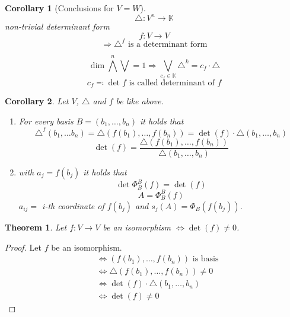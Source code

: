 \documentclass[a4paper,landscape,twocolumn]{article}
\newtheorem{theorem}{Theorem}
\newtheorem{cor}{Corollary}
\begin{document}
\begin{cor}[Conclusions for $V = W$]
  \label{cor-7.26}
  \[ \triangle: V^n \to \mathbb K \]
  non-trivial determinant form
  \[ f: V \to V \]
  \[ \Rightarrow \triangle^f \text{ is a determinant form} \]

  \[ \dim{\bigwedge^n \bigvee} = 1 \Rightarrow \bigvee_{c_f \in \mathbb K} \triangle^k = c_f \cdot \triangle \]
  \[ c_f \eqqcolon \det{f} \text{ is called determinant of $f$} \]
\end{cor}

\begin{cor}
  \label{cor-7.27}
  Let $V$, $\triangle$ and $f$ be like above.
  \begin{enumerate}
    \item
      For every basis $B = (b_1, \ldots, b_n)$
      it holds that
      \[ \triangle^f(b_1, \ldots b_n) = \triangle(f(b_1), \ldots, f(b_n)) = \det(f) \cdot \triangle(b_1, \ldots, b_n) \]
      \[ \det(f) = \frac{\triangle(f(b_1), \ldots, f(b_n))}{\triangle(b_1, \ldots, b_n)} \]
    \item
      with $a_j = f(b_j)$ it holds that
      \[ \det{\Phi_B^B(f)} = \det(f) \]
      \[ A = \Phi_B^B(f) \]
      $a_{ij} = $ i-th coordinate of $f(b_j)$ and $s_j(A) = \Phi_B(f(b_j))$.
  \end{enumerate}
\end{cor}

\begin{theorem}
  \label{theorem-7.28}
  Let $f: V \to V$ be an isomorphism $\Leftrightarrow \det(f) \neq 0$.
\end{theorem}
\begin{proof}
  Let $f$ be an isomorphism.
  \begin{align*}
    &\Leftrightarrow (f(b_1), \ldots, f(b_n)) \text{ is basis} \\
    &\Leftrightarrow \triangle (f(b_1), \ldots, f(b_n)) \neq 0 \\
    &\Leftrightarrow \det(f) \cdot \triangle(b_1, \ldots, b_n) \\
    &\Leftrightarrow \det(f) \neq 0
  \end{align*}
\end{proof}
\end{document}
